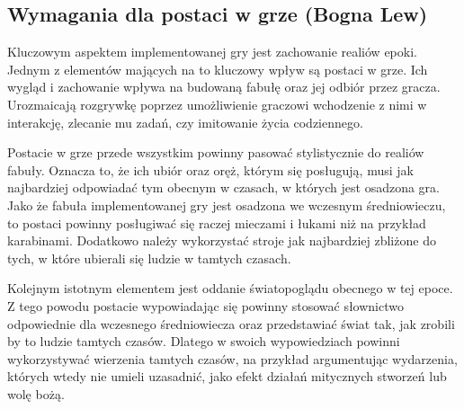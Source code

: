 \subsection{Wymagania dla postaci w grze (Bogna Lew)}
Kluczowym aspektem implementowanej gry jest zachowanie realiów epoki. Jednym z elementów mających na to kluczowy wpływ
są postaci w grze. Ich wygląd i zachowanie wpływa na budowaną fabułę oraz jej odbiór przez gracza. Urozmaicają rozgrywkę
poprzez umożliwienie graczowi wchodzenie z nimi w interakcję, zlecanie mu zadań, czy imitowanie życia codziennego.

Postacie w grze przede wszystkim powinny pasować stylistycznie do realiów fabuły. Oznacza to, że ich ubiór oraz oręż,
którym się posługują, musi jak najbardziej odpowiadać tym obecnym w czasach, w których jest osadzona gra. Jako że
fabuła implementowanej gry jest osadzona we wczesnym średniowieczu, to postaci powinny posługiwać się raczej mieczami i
łukami niż na przykład karabinami. Dodatkowo należy wykorzystać stroje jak najbardziej zbliżone do tych, w które ubierali
się ludzie w tamtych czasach.

Kolejnym istotnym elementem jest oddanie światopoglądu obecnego w tej epoce. Z tego powodu postacie wypowiadając się
powinny stosować słownictwo odpowiednie dla wczesnego średniowiecza oraz przedstawiać świat tak, jak zrobili by to
ludzie tamtych czasów. Dlatego w swoich wypowiedziach powinni wykorzystywać wierzenia tamtych czasów, na przykład
argumentując wydarzenia, których wtedy nie umieli uzasadnić, jako efekt działań mitycznych stworzeń lub wolę bożą.